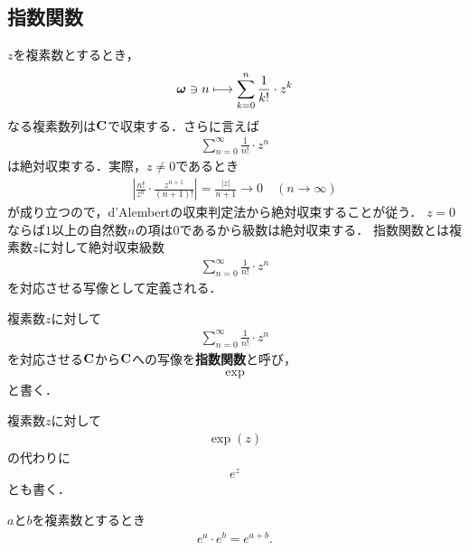 \subsection{指数関数}
	
	$z$を複素数とするとき，
	\begin{align}
		{\boldsymbol \omega} \ni n \longmapsto \sum_{k=0}^n \frac{1}{k!} \cdot z^k
	\end{align}
	なる複素数列は$\mathbf{C}$で収束する．さらに言えば
	\begin{align}
		\sum_{n=0}^\infty \frac{1}{n!} \cdot z^n
	\end{align}
	は絶対収束する．実際，$z \neq 0$であるとき
	\begin{align}
		\left|\frac{n!}{z^n} \cdot \frac{z^{n+1}}{(n+1)!}\right|
		= \frac{|z|}{n+1}
		\longrightarrow 0\quad (n \longrightarrow \infty)
	\end{align}
	が成り立つので，d'Alembertの収束判定法から絶対収束することが従う．
	$z=0$ならば$1$以上の自然数$n$の項は$0$であるから級数は絶対収束する．
	指数関数とは複素数$z$に対して絶対収束級数
	\begin{align}
		\sum_{n = 0}^\infty \frac{1}{n!} \cdot z^n
	\end{align}
	を対応させる写像として定義される．
	
	\begin{screen}
		\begin{dfn}[指数関数]
			複素数$z$に対して
			\begin{align}
				\sum_{n=0}^\infty \frac{1}{n!} \cdot z^n
			\end{align}
			を対応させる$\mathbf{C}$から$\mathbf{C}$への写像を{\bf 指数関数}と呼び，
			\begin{align}
				\exp
			\end{align}
			と書く．
		\end{dfn}
	\end{screen}
	
	複素数$z$に対して
	\begin{align}
		\exp{(z)}
	\end{align}
	の代わりに
	\begin{align}
		e^z
	\end{align}
	とも書く．
	
	\begin{screen}
		\begin{thm}[指数法則]
			$a$と$b$を複素数とするとき
			\begin{align}
				e^a \cdot e^b = e^{a + b}.
			\end{align}
		\end{thm}
	\end{screen}
	
